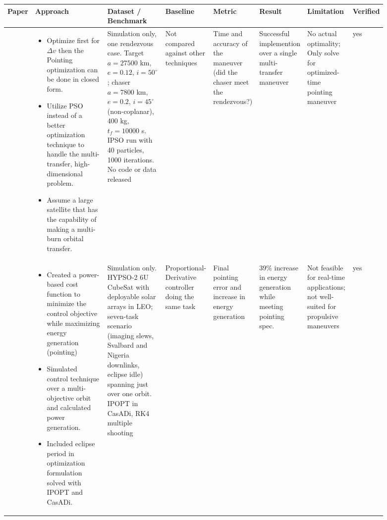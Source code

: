 {\footnotesize\setlength{\tabcolsep}{3pt}
\begin{longtable}{@{}p{0.06\linewidth}p{0.20\linewidth}p{0.16\linewidth}p{0.10\linewidth}p{0.09\linewidth}p{0.11\linewidth}p{0.12\linewidth}p{0.05\linewidth}@{}}
  \toprule
    Paper & Approach & Dataset / Benchmark & Baseline & Metric & Result & Limitation & Verified \\
  \midrule
  \endhead
    \cite{zhangFinitetimeAttitudeSetpoint2020} & 
    \begin{minipage}[t]{\linewidth}
    \begin{itemize}[nosep, left-margin=1em]
        \item Optimize first for $\Delta v$ then the Pointing optimization can be done in closed form.
        \item Utilize PSO instead of a better optimization technique to handle the multi-transfer, high-dimensional problem.
        \item Assume a large satellite that has the capability of making a multi-burn orbital transfer.\strut
    \end{itemize}
    \end{minipage} &
    Simulation only, one rendezvous case. Target $a = 27500$ km, $e = 0.12$, $i = 50^\circ$; chaser $a = 7800$ km, $e = 0.2$, $i = 45^\circ$ (non-coplanar), 400 kg, $t_f = 10000$ s. IPSO run with 40 particles, 1000 iterations. No code or data released &
    Not compared against other techniques &
    Time and accuracy of the maneuver (did the chaser meet the rendezvous?) & 
    Successful implemention over a single multi-transfer maneuver&  
    No actual optimality; Only solve for optimized-time pointing maneuver & 
    yes \\
    \addlinespace
    \cite{kristiansenEnergyOptimalAttitude2024} & 
    \begin{minipage}[t]{\linewidth}
    \begin{itemize}[nosep, left-margin=1em]
        \item Created a power-based cost function to minimize the control objective while maximizing energy generation (pointing)
        \item Simulated control technique over a multi-objective orbit and calculated power generation.
        \item Included eclipse period in optimization formulation solved with IPOPT and CasADi.\strut
   \end{itemize}
   \end{minipage} &
    Simulation only. HYPSO-2 6U CubeSat with deployable solar arrays in LEO; seven-task scenario (imaging slews, Svalbard and Nigeria downlinks, eclipse idle) spanning just over one orbit. IPOPT in CasADi, RK4 multiple shooting &
    Proportional-Derivative controller doing the same task &
    Final pointing error and increase in energy generation & 
    39\% increase in energy generation while meeting pointing spec. &  
    Not feasible for real-time applications; not well-suited for propulsive maneuvers & 
    yes \\
  \bottomrule
\end{longtable}}

